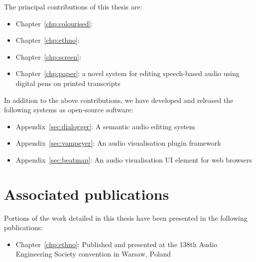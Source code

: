 The principal contributions of this thesis are:
\begin{itemize}
  \item Chapter~\ref{chp:colourised}: 
  \item Chapter~\ref{chp:ethno}: 
  \item Chapter~\ref{chp:screen}: 
  \item Chapter~\ref{chp:paper}: a novel system for editing speech-based audio using digital pens on printed transcripts
\end{itemize}

In addition to the above contributions, we have developed and released the following systems as open-source software:

\begin{itemize}
  \item Appendix~\ref{sec:dialogger}: A semantic audio editing system
  \item Appendix~\ref{sec:vampeyer}: An audio visualisation plugin framework
  \item Appendix~\ref{sec:beatmap}: An audio visualisation UI element for web browsers
\end{itemize}

\section{Associated publications}\label{sec:intro-publications}

Portions of the work detailed in this thesis have been presented in the following publications:

\begin{itemize}
  \item Chapter~\ref{chp:ethno}: Published and presented at the 138th Audio Engineering Society convention in Warsaw,
    Poland \citep{Baume2015}
\end{itemize}
